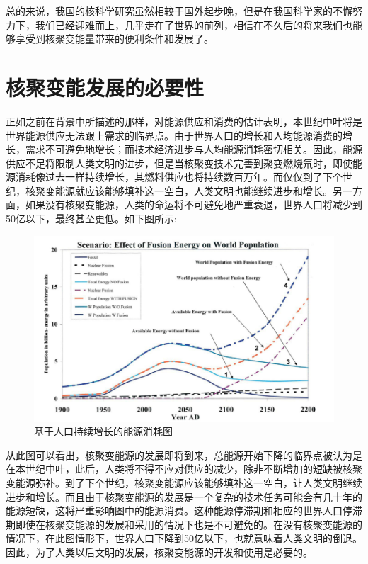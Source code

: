 总的来说，我国的核科学研究虽然相较于国外起步晚，但是在我国科学家的不懈努力下，我们已经迎难而上，几乎走在了世界的前列，相信在不久后的将来我们也能够享受到核聚变能量带来的便利条件和发展了。
\section{核聚变能发展的必要性}
正如之前在背景中所描述的那样，对能源供应和消费的估计表明，本世纪中叶将是世界能源供应无法跟上需求的临界点。由于世界人口的增长和人均能源消费的增长，需求不可避免地增长；而技术经济进步与人均能源消耗密切相关。因此，能源供应不足将限制人类文明的进步，但是当核聚变技术完善到聚变燃烧氘时，即使能源消耗像过去一样持续增长，其燃料供应也将持续数百万年。而仅仅到了下个世纪，核聚变能源就应该能够填补这一空白，人类文明也能继续进步和增长。另一方面，如果没有核聚变能源，人类的命运将不可避免地严重衰退，世界人口将减少到50亿以下，最终甚至更低。如下图所示\cite{Lee2011NuclearFE}:
\begin{figure}[htb]
	\begin{center}
		\includegraphics[width=\textwidth]{pic/n.png}
		\caption{基于人口持续增长的能源消耗图}
		\label{fig:example_img}
	\end{center}
\end{figure}
\par 从此图可以看出，核聚变能源的发展即将到来，总能源开始下降的临界点被认为是在本世纪中叶，此后，人类将不得不应对供应的减少，除非不断增加的短缺被核聚变能源弥补。到了下个世纪，核聚变能源应该能够填补这一空白，让人类文明继续进步和增长。而且由于核聚变能源的发展是一个复杂的技术任务可能会有几十年的能源短缺，这将严重影响图中的能源消费。这种能源停滞期和相应的世界人口停滞期即使在核聚变能源的发展和采用的情况下也是不可避免的。在没有核聚变能源的情况下，在此图情形下，世界人口下降到50亿以下，也就意味着人类文明的倒退。因此，为了人类以后文明的发展，核聚变能源的开发和使用是必要的。